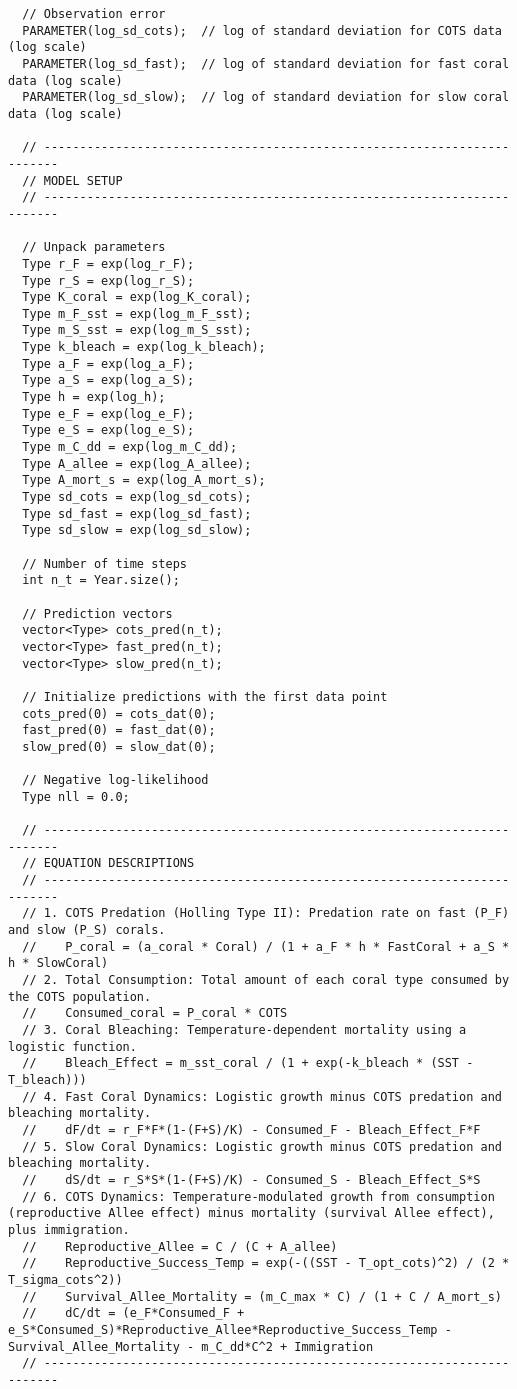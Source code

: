 \begin{lstlisting}
  // Observation error
  PARAMETER(log_sd_cots);  // log of standard deviation for COTS data (log scale)
  PARAMETER(log_sd_fast);  // log of standard deviation for fast coral data (log scale)
  PARAMETER(log_sd_slow);  // log of standard deviation for slow coral data (log scale)

  // ------------------------------------------------------------------------
  // MODEL SETUP
  // ------------------------------------------------------------------------

  // Unpack parameters
  Type r_F = exp(log_r_F);
  Type r_S = exp(log_r_S);
  Type K_coral = exp(log_K_coral);
  Type m_F_sst = exp(log_m_F_sst);
  Type m_S_sst = exp(log_m_S_sst);
  Type k_bleach = exp(log_k_bleach);
  Type a_F = exp(log_a_F);
  Type a_S = exp(log_a_S);
  Type h = exp(log_h);
  Type e_F = exp(log_e_F);
  Type e_S = exp(log_e_S);
  Type m_C_dd = exp(log_m_C_dd);
  Type A_allee = exp(log_A_allee);
  Type A_mort_s = exp(log_A_mort_s);
  Type sd_cots = exp(log_sd_cots);
  Type sd_fast = exp(log_sd_fast);
  Type sd_slow = exp(log_sd_slow);

  // Number of time steps
  int n_t = Year.size();

  // Prediction vectors
  vector<Type> cots_pred(n_t);
  vector<Type> fast_pred(n_t);
  vector<Type> slow_pred(n_t);

  // Initialize predictions with the first data point
  cots_pred(0) = cots_dat(0);
  fast_pred(0) = fast_dat(0);
  slow_pred(0) = slow_dat(0);

  // Negative log-likelihood
  Type nll = 0.0;

  // ------------------------------------------------------------------------
  // EQUATION DESCRIPTIONS
  // ------------------------------------------------------------------------
  // 1. COTS Predation (Holling Type II): Predation rate on fast (P_F) and slow (P_S) corals.
  //    P_coral = (a_coral * Coral) / (1 + a_F * h * FastCoral + a_S * h * SlowCoral)
  // 2. Total Consumption: Total amount of each coral type consumed by the COTS population.
  //    Consumed_coral = P_coral * COTS
  // 3. Coral Bleaching: Temperature-dependent mortality using a logistic function.
  //    Bleach_Effect = m_sst_coral / (1 + exp(-k_bleach * (SST - T_bleach)))
  // 4. Fast Coral Dynamics: Logistic growth minus COTS predation and bleaching mortality.
  //    dF/dt = r_F*F*(1-(F+S)/K) - Consumed_F - Bleach_Effect_F*F
  // 5. Slow Coral Dynamics: Logistic growth minus COTS predation and bleaching mortality.
  //    dS/dt = r_S*S*(1-(F+S)/K) - Consumed_S - Bleach_Effect_S*S
  // 6. COTS Dynamics: Temperature-modulated growth from consumption (reproductive Allee effect) minus mortality (survival Allee effect), plus immigration.
  //    Reproductive_Allee = C / (C + A_allee)
  //    Reproductive_Success_Temp = exp(-((SST - T_opt_cots)^2) / (2 * T_sigma_cots^2))
  //    Survival_Allee_Mortality = (m_C_max * C) / (1 + C / A_mort_s)
  //    dC/dt = (e_F*Consumed_F + e_S*Consumed_S)*Reproductive_Allee*Reproductive_Success_Temp - Survival_Allee_Mortality - m_C_dd*C^2 + Immigration
  // ------------------------------------------------------------------------


\end{lstlisting}
